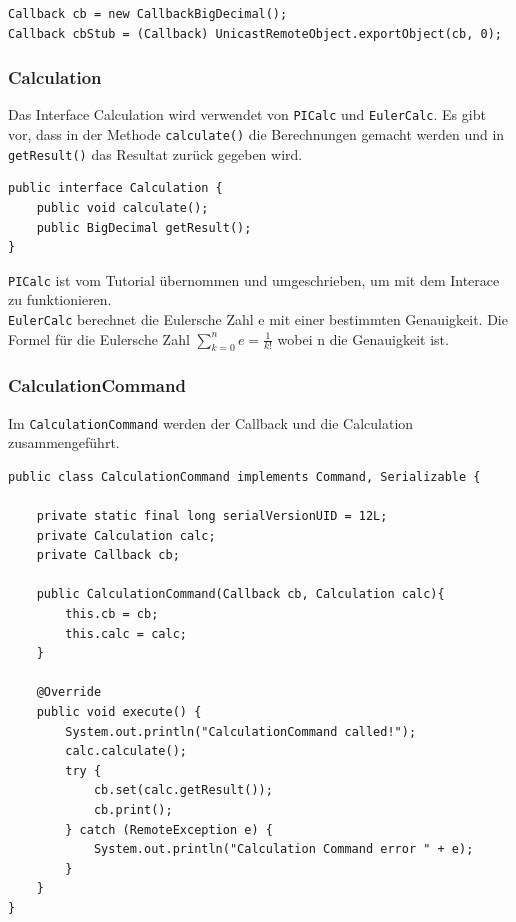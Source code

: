 \begin{lstlisting}[style=Java, caption=Callback]
Callback cb = new CallbackBigDecimal();
Callback cbStub = (Callback) UnicastRemoteObject.exportObject(cb, 0);
\end{lstlisting}

\clearpage

\subsubsection{Calculation}

Das Interface Calculation wird verwendet von \texttt{PICalc} und \texttt{EulerCalc}.
Es gibt vor, dass in der Methode \texttt{calculate()} die Berechnungen gemacht werden und
in \texttt{getResult()} das Resultat zur\"uck gegeben wird.

\begin{lstlisting}[style=Java, caption=Callback Interface]
public interface Calculation {
	public void calculate();
	public BigDecimal getResult();
}
\end{lstlisting}

\texttt{PICalc} ist vom Tutorial \"ubernommen und umgeschrieben, um mit dem Interace zu funktionieren.\\
\texttt{EulerCalc} berechnet die Eulersche Zahl e mit einer bestimmten Genauigkeit.
Die Formel f\"ur die Eulersche Zahl \(\sum \limits_{k=0}^n e = \frac{1}{k!}\) wobei n die Genauigkeit ist.

\subsubsection{CalculationCommand}

Im \texttt{CalculationCommand} werden der Callback und die Calculation zusammengef\"uhrt.

\begin{lstlisting}[style=Java, caption=CalculationCommand Klasse]
public class CalculationCommand implements Command, Serializable {

    private static final long serialVersionUID = 12L;
    private Calculation calc;
    private Callback cb;

    public CalculationCommand(Callback cb, Calculation calc){
        this.cb = cb;
        this.calc = calc;
    }

    @Override
    public void execute() {
        System.out.println("CalculationCommand called!");
        calc.calculate();
        try {
            cb.set(calc.getResult());
            cb.print();
        } catch (RemoteException e) {
            System.out.println("Calculation Command error " + e);
        }
    }
}
\end{lstlisting}

